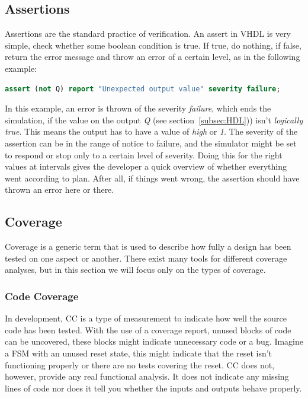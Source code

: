 \documentclass[11pt,british]{article}
\begin{document}
\subsection{Assertions}
\label{subsec:assertions}
Assertions are the standard practice of verification. An assert in VHDL is very simple, check whether some boolean condition is true. If true, do nothing, if false, return the error message and throw an error of a certain level, as in the following example:
\begin{lstlisting}[language=VHDL, tabsize=4, frame=single, framesep=2mm, belowskip=8pt, aboveskip=8pt, showstringspaces=false]
assert (not Q) report "Unexpected output value" severity failure;
\end{lstlisting}
In this example, an error is thrown of the severity \emph{failure}, which ends the simulation, if the value on the output \emph{Q} (see section~\ref{subsec:HDL})) isn't \emph{logically true}. This means the output has to have a value of \emph{high} or \emph{1}. The severity of the assertion can be in the range of notice to failure, and the simulator might be set to respond or stop only to a certain level of severity. Doing this for the right values at intervals gives the developer a quick overview of whether everything went according to plan. After all, if things went wrong, the assertion should have thrown an error here or there.

\subsection{Coverage}
Coverage is a generic term that is used to describe how fully a design has been tested on one aspect or another. There exist many tools for different coverage analyses, but in this section we will focus only on the types of coverage.

\subsubsection{Code Coverage}
In development, \gls{CC} is a type of measurement to indicate how well the source code has been tested. With the use of a coverage report, unused blocks of code can be uncovered, these blocks might indicate unnecessary code or a bug. Imagine a \gls{FSM} with an unused reset state, this might indicate that the reset isn't functioning properly or there are no tests covering the reset. CC does not, however, provide any real functional analysis. It does not indicate any missing lines of code nor does it tell you whether the inputs and outputs behave properly.
\end{document}
